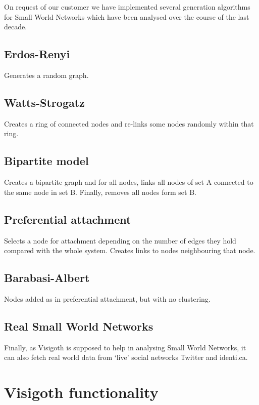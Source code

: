 \documentclass[a4paper,11pt,titlepage]{article}
\let\stdsection\section         %
\renewcommand{\section}{\newpage\stdsection}
\begin{document}
On request of our customer we have implemented several generation
algorithms for Small World Networks which have been analysed over
the course of the last decade.

\subsection{Erdos-Renyi}
Generates a random graph.

\subsection{Watts-Strogatz}
Creates a ring of connected nodes and re-links some nodes randomly
within that ring.

\subsection{Bipartite model}
Creates a bipartite graph and for all nodes, links all nodes of
set A connected to the same node in set B. Finally, removes all
nodes form set B.

\subsection{Preferential attachment}
Selects a node for attachment depending on the number of edges
they hold compared with the whole system. Creates links to nodes
neighbouring that node.

\subsection{Barabasi-Albert}
Nodes added as in preferential attachment, but with no clustering.

\subsection{Real Small World Networks}
Finally, as Visigoth is supposed to help in analysing Small World
Networks, it can also fetch real world data from `live' social
networks Twitter and identi.ca.




\section{Visigoth functionality}

\end{document}
